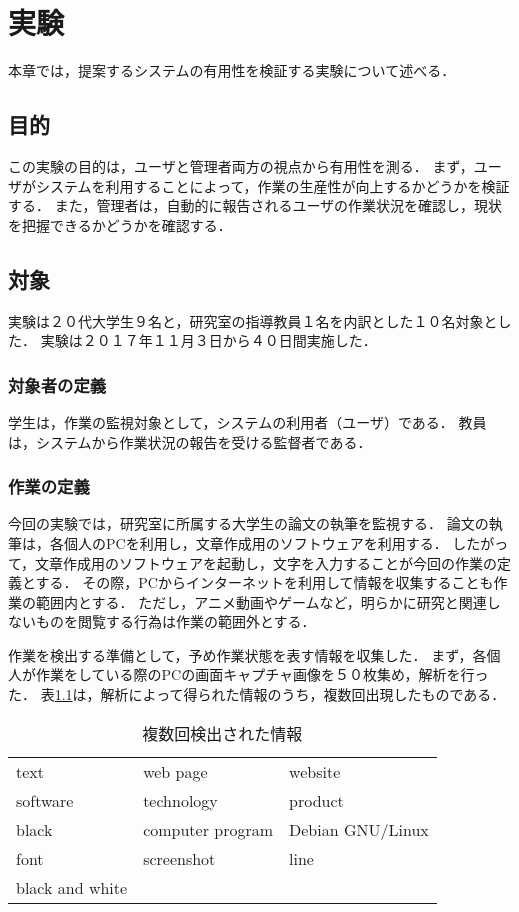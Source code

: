 \chapter{実験}
本章では，提案するシステムの有用性を検証する実験について述べる．

\section{目的}
この実験の目的は，ユーザと管理者両方の視点から有用性を測る．
まず，ユーザがシステムを利用することによって，作業の生産性が向上するかどうかを検証する．
また，管理者は，自動的に報告されるユーザの作業状況を確認し，現状を把握できるかどうかを確認する．

\section{対象}
実験は２０代大学生９名と，研究室の指導教員１名を内訳とした１０名対象とした．
実験は２０１７年１１月３日から４０日間実施した．

\subsection{対象者の定義}
学生は，作業の監視対象として，システムの利用者（ユーザ）である．
教員は，システムから作業状況の報告を受ける監督者である．

\subsection{作業の定義}
今回の実験では，研究室に所属する大学生の論文の執筆を監視する．
論文の執筆は，各個人のPCを利用し，文章作成用のソフトウェアを利用する．
したがって，文章作成用のソフトウェアを起動し，文字を入力することが今回の作業の定義とする．
その際，PCからインターネットを利用して情報を収集することも作業の範囲内とする．
ただし，アニメ動画やゲームなど，明らかに研究と関連しないものを閲覧する行為は作業の範囲外とする．

作業を検出する準備として，予め作業状態を表す情報を収集した．
まず，各個人が作業をしている際のPCの画面キャプチャ画像を５０枚集め，解析を行った．
表\ref{tab:positive_words}は，解析によって得られた情報のうち，複数回出現したものである．

\begin{table}[htb]
  \begin{center}
    \label{tab:positive_words}
    \caption{複数回検出された情報}
    \begin{tabular}{lll}
      text & web page & website \\
      software & technology & product  \\
      black & computer program & Debian GNU/Linux \\
      font & screenshot & line \\
      black and white & &
    \end{tabular}
  \end{center}
\end{table}

